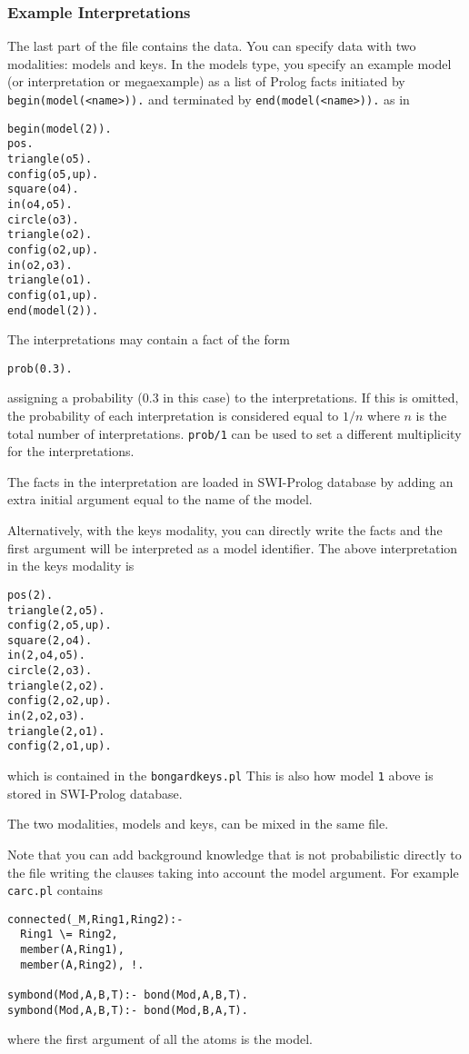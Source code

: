 \documentclass[a4paper,10pt]{article}
\begin{document}
\subsubsection{Example Interpretations}
The last part of the file contains the data.
You can specify data with two modalities:
models and keys.
In the models type, you specify an example model (or interpretation or megaexample) as a list of Prolog facts initiated by 
\texttt{begin(model(<name>)).} and terminated by \texttt{end(model(<name>)).} as in
\begin{verbatim}
begin(model(2)).
pos.
triangle(o5).
config(o5,up).
square(o4).
in(o4,o5).
circle(o3).
triangle(o2).
config(o2,up).
in(o2,o3).
triangle(o1).
config(o1,up).
end(model(2)).
\end{verbatim}
The interpretations may contain a fact of the form
\begin{verbatim}
prob(0.3).
\end{verbatim}
assigning a probability (0.3 in this case) to the interpretations. If this is omitted, the probability of each interpretation is considered equal to $1/n$ where $n$ is the total number of interpretations. \verb|prob/1| can be used to set a different multiplicity for the interpretations.

The facts in the interpretation are loaded in SWI-Prolog database by adding an extra initial argument equal to the name of the model.

Alternatively, with the keys modality, you can directly write the facts and the first argument will be interpreted as a model identifier. The above interpretation in the keys modality is
\begin{verbatim}
pos(2).
triangle(2,o5).
config(2,o5,up).
square(2,o4).
in(2,o4,o5).
circle(2,o3).
triangle(2,o2).
config(2,o2,up).
in(2,o2,o3).
triangle(2,o1).
config(2,o1,up).
\end{verbatim}
which is contained in the \verb|bongardkeys.pl|
This is also how model \verb|1| above is stored in SWI-Prolog database.

The two modalities, models and keys, can be mixed in the same file.

Note that you can add background knowledge that is not probabilistic directly to the file writing the clauses taking into account the model argument. For example \verb|carc.pl|
contains

\begin{verbatim}
connected(_M,Ring1,Ring2):-
  Ring1 \= Ring2,
  member(A,Ring1),
  member(A,Ring2), !.

symbond(Mod,A,B,T):- bond(Mod,A,B,T).
symbond(Mod,A,B,T):- bond(Mod,B,A,T).
\end{verbatim}
where the first argument of all the atoms is the model.
\end{document}
